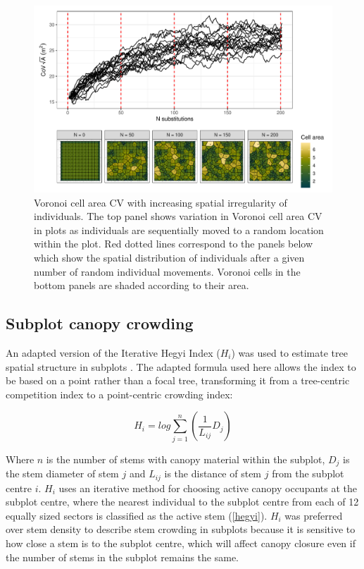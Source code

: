 \documentclass[11pt,a4paper]{article}
\begin{document}
\begin{figure}
\centering
	\includegraphics[width=\linewidth]{voronoi_diag}
	\caption{Voronoi cell area CV with increasing spatial irregularity of individuals. The top panel shows variation in Voronoi cell area CV in \wireps{} plots as individuals are sequentially moved to a random location within the plot. Red dotted lines correspond to the panels below which show the spatial distribution of individuals after a given number of random individual movements. Voronoi cells in the bottom panels are shaded according to their area.}
	\label{voronoi_diag}
\end{figure}

\subsection{Subplot canopy crowding}

An adapted version of the Iterative Hegyi Index ($H_{i}$) was used to estimate tree spatial structure in subplots \citep{Hegyi1974}. The adapted formula used here allows the index to be based on a point rather than a focal tree, transforming it from a tree-centric competition index to a point-centric crowding index:

\begin{equation}
	H_{i} = log\sum_{j=1}^{n} (\frac{1}{L_{ij}} D_{j})
\end{equation}

Where $n$ is the number of stems with canopy material within the subplot, $D_{j}$ is the stem diameter of stem $j$ and $L_{ij}$ is the distance of stem $j$ from the subplot centre $i$. $H_{i}$ uses an iterative method for choosing active canopy occupants at the subplot centre, where the nearest individual to the subplot centre from each of 12 equally sized sectors is classified as the active stem (\autoref{hegyi}). $H_{i}$ was preferred over stem density to describe stem crowding in subplots because it is sensitive to how close a stem is to the subplot centre, which will affect canopy closure even if the number of stems in the subplot remains the same. 
\end{document}
